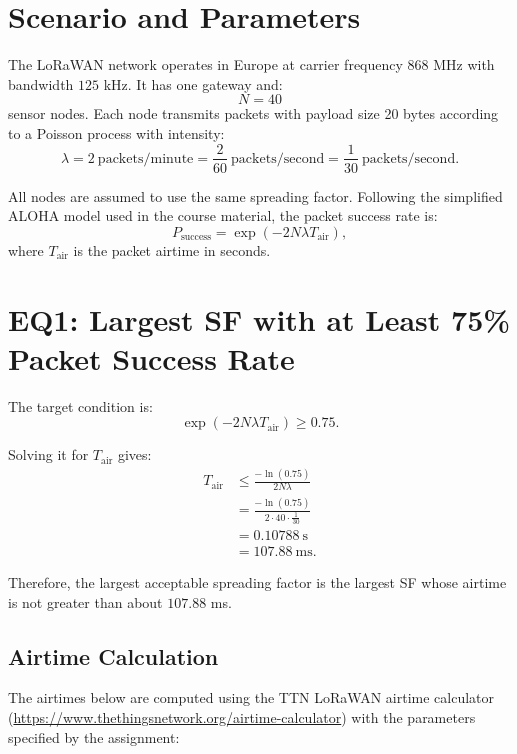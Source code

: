 \documentclass[a4paper,11pt]{article}
\title{\challengename}
\author{
  \authorname\\
  Person Code: \personcode\\
  \groupinfo
}
\date{\today}
\begin{document}
\maketitle
\thispagestyle{empty}

\section*{Scenario and Parameters}

The LoRaWAN network operates in Europe at carrier frequency $868$ MHz with
bandwidth $125$ kHz. It has one gateway and:
\[
  N = 40
\]
sensor nodes. Each node transmits packets with payload size 20 bytes according
to a Poisson process with intensity:
\[
  \lambda = 2\ \mathrm{packets/minute}
  = \frac{2}{60}\ \mathrm{packets/second}
  = \frac{1}{30}\ \mathrm{packets/second}.
\]

All nodes are assumed to use the same spreading factor. Following the simplified
ALOHA model used in the course material, the packet success rate is:
\[
  P_{\mathrm{success}} =
  \exp\left(-2N\lambda T_{\mathrm{air}}\right),
\]
where $T_{\mathrm{air}}$ is the packet airtime in seconds.

\section*{EQ1: Largest SF with at Least 75\% Packet Success Rate}

The target condition is:
\[
  \exp\left(-2N\lambda T_{\mathrm{air}}\right) \geq 0.75.
\]

Solving it for $T_{\mathrm{air}}$ gives:
\[
\begin{aligned}
T_{\mathrm{air}}
  &\leq \frac{-\ln(0.75)}{2N\lambda} \\
  &= \frac{-\ln(0.75)}{2 \cdot 40 \cdot \frac{1}{30}} \\
  &= 0.10788\ \mathrm{s} \\
  &= 107.88\ \mathrm{ms}.
\end{aligned}
\]

Therefore, the largest acceptable spreading factor is the largest SF whose
airtime is not greater than about $107.88$ ms.

\subsection*{Airtime Calculation}

The airtimes below are computed using the TTN LoRaWAN airtime calculator
(\url{https://www.thethingsnetwork.org/airtime-calculator}) with the parameters
specified by the assignment:
\end{document}
